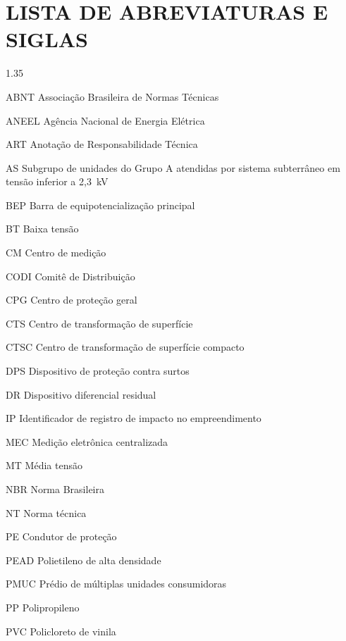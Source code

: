 \cleardoublepage
{}
\chapter*{LISTA DE ABREVIATURAS E SIGLAS}
\begin{Spacing}{1.35}
\begin{list}{}{\setlength{\labelwidth}{2.6cm}\setlength{\leftmargin}{3.0cm}\setlength{\labelsep}{0.4cm}\setlength{\itemsep}{0pt}\setlength{\parsep}{0pt}\setlength{\topsep}{0pt}\renewcommand{\makelabel}[1]{#1\hfill}}
  \item[ABNT] Associação Brasileira de Normas Técnicas
  \item[ANEEL] Agência Nacional de Energia Elétrica
  \item[ART] Anotação de Responsabilidade Técnica
  \item[AS] Subgrupo de unidades do Grupo A atendidas por sistema subterrâneo em tensão inferior a 2,3~kV
  \item[BEP] Barra de equipotencialização principal
  \item[BT] Baixa tensão
  \item[CM] Centro de medição
  \item[CODI] Comitê de Distribuição
  \item[CPG] Centro de proteção geral
  \item[CTS] Centro de transformação de superfície
  \item[CTSC] Centro de transformação de superfície compacto
  \item[DPS] Dispositivo de proteção contra surtos
  \item[DR] Dispositivo diferencial residual
  \item[IP] Identificador de registro de impacto no empreendimento
  \item[MEC] Medição eletrônica centralizada
  \item[MT] Média tensão
  \item[NBR] Norma Brasileira
  \item[NT] Norma técnica
  \item[PE] Condutor de proteção
  \item[PEAD] Polietileno de alta densidade
  \item[PMUC] Prédio de múltiplas unidades consumidoras
  \item[PP] Polipropileno
  \item[PVC] Policloreto de vinila

\end{list}
\end{Spacing}

